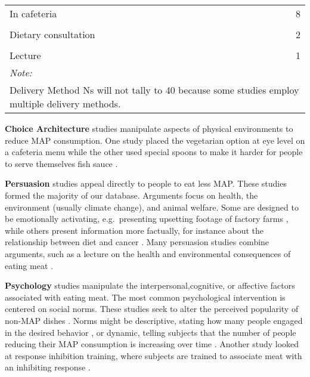 \documentclass[sn-nature,referee,pdflatex]{sn-jnl}
\begin{document}
\begin{table}[!h]
{\begin{tabular}[t]{lr}
\hspace{1em}In cafeteria & 8\\
\hspace{1em}\cellcolor{gray!10}{Online} & \cellcolor{gray!10}{7}\\
\hspace{1em}Dietary consultation & 2\\
\hspace{1em}\cellcolor{gray!10}{Free Meat Alternative} & \cellcolor{gray!10}{2}\\
\hspace{1em}Lecture & 1\\
\bottomrule
\multicolumn{2}{l}{\rule{0pt}{1em}\textit{Note: }}\\
\multicolumn{2}{l}{\rule{0pt}{1em}Delivery Method Ns will not tally to 40 because some studies employ multiple delivery methods.}\\
\end{tabular}}
\endgroup{}
\end{table}

\textbf{Choice Architecture} studies
\citep{andersson2021, kanchanachitra2020} manipulate aspects of physical
environments to reduce MAP consumption. One study placed the vegetarian
option at eye level on a cafeteria menu \citep{andersson2021} while the
other used special spoons to make it harder for people to serve
themselves fish sauce \citep{kanchanachitra2020}.

\textbf{Persuasion} studies
\citep{kanchanachitra2020, abrahamse2007, acharya2004, banerjee2019, bianchi2022, bochmann2017, bschaden2020, carfora2023, hennessy2016, piester2020, cooney2014, cooney2016, feltz2022, haile2021, hatami2018, jalil2023, mathur2021effectiveness, merrill2009, norris2014, peacock2017, polanco2022, sparkman2021, weingarten2022}
appeal directly to people to eat less MAP. These studies formed the
majority of our database. Arguments focus on health, the environment
(usually climate change), and animal welfare. Some are designed to be
emotionally activating, e.g.~presenting upsetting footage of factory
farms \citep{polanco2022}, while others present information more
factually, for instance about the relationship between diet and cancer
\citep{hatami2018}. Many persuasion studies combine arguments, such as a
lecture on the health and environmental consequences of eating meat
\citep{jalil2023}.

\textbf{Psychology} studies
\citep{aldoh2023, allen2002, camp2019, coker2022, piester2020, sparkman2020}
manipulate the interpersonal,cognitive, or affective factors associated
with eating meat. The most common psychological intervention is centered
on social norms. These studies seek to alter the perceived popularity of
non-MAP dishes \citep{sparkman2020}. Norms might be descriptive, stating
how many people engaged in the desired behavior \citep{aldoh2023}, or
dynamic, telling subjects that the number of people reducing their MAP
consumption is increasing over time
\citep{aldoh2023, coker2022, sparkman2020}. Another study looked at
response inhibition training, where subjects are trained to associate
meat with an inhibiting response \citep{camp2019}.
\end{document}
